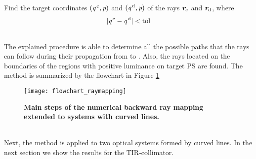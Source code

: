\begin{algorithm}
\begin{algorithmic}[1]
\State Find the target coordinates $(\textit{q}^{\,\textrm{c}},\textit{p})$ and $(\textit{q}^{\,\textrm{d}},\textit{p})$ of the rays $\textit{\textbf{r}}_{\textrm{c}}$ and $\textit{\textbf{r}}_{\textrm{d}}$, where $$|\textit{q}^{\,\textrm{c}}-\textit{q}^{\,\textrm{d}}|<\textrm{tol}$$
\If {$\lineaj\neq \nline$}
\State{}
\EndIf 
\State{}
\EndIf
\EndProcedure
\end{algorithmic}
\end{algorithm}
\\ \indent The explained procedure is able to determine all the possible paths that the rays can follow during their propagation from  to . Also, the rays located on the boundaries of the regions with positive luminance on target PS  are found.
The method is summarized by the flowchart in Figure \ref{fig:flowchart_raymapping}
\begin{figure}[t]
  \begin{center}
  \texttt{[image: flowchart\_raymapping]}
  \end{center}
  \caption{\textbf{Main steps of the numerical backward ray mapping extended to systems with curved lines.}}
\label{fig:flowchart_raymapping}
 \end{figure}
\\ \indent
Next, the method is applied to two optical systems formed by curved lines. In the next section we show the results for the TIR-collimator.
